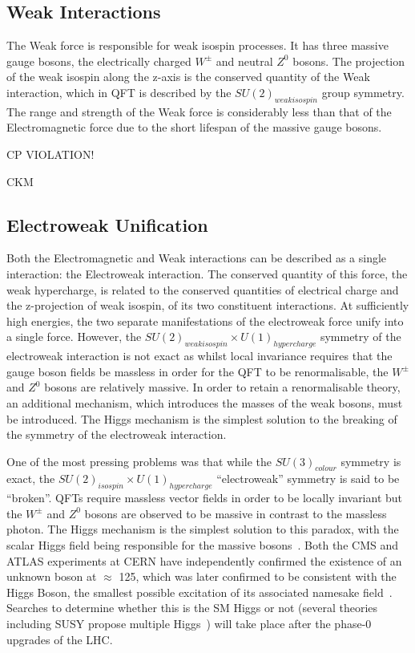 \subsection{Weak Interactions}\label{subsec:weakForce}
The Weak force is responsible for weak isospin processes. 
It has three massive gauge bosons, the electrically charged $W^{\pm}$ and neutral $Z^{0}$ bosons. 
The projection of the weak isospin along the z-axis is the conserved quantity of the Weak interaction, which in QFT is described by the $SU(2)_{weak isospin}$ group symmetry. 
The range and strength of the Weak force is considerably less than that of the Electromagnetic force due to the short lifespan of the massive gauge bosons\cite{ElectroweakStrong}. 


CP VIOLATION!	

CKM

\subsection{Electroweak Unification}\label{subsec:electroweak}

Both the Electromagnetic and Weak interactions can be described as a single interaction: the Electroweak interaction. 
The conserved quantity of this force, the weak hypercharge, is related to the conserved quantities of electrical charge and the z-projection of weak isospin, of its two constituent interactions. 
At sufficiently high energies, the two separate manifestations of the electroweak force unify into a single force. 
However, the $SU(2)_{weak isospin} \times U(1)_{hypercharge}$ symmetry of the electroweak interaction is not exact as whilst local invariance requires that the gauge boson fields be massless in order for the QFT to be renormalisable, the $W^{\pm}$ and $Z^{0}$ bosons are relatively massive. 
In order to retain a renormalisable theory, an additional mechanism, which introduces the masses of the weak bosons, must be introduced. 
The Higgs mechanism is the simplest solution to the breaking of the symmetry of the electroweak interaction\cite{LagrangiansSM}. 

One of the most pressing problems was that while the $SU(3)_{colour}$ symmetry is exact, the $SU(2)_{isospin} \times U(1)_{hypercharge}$ ``electroweak'' symmetry is said to be ``broken''. 
QFTs require massless vector fields in order to be locally invariant but the $W^{\pm}$ and $Z^{0}$ bosons are observed to be massive in contrast to the massless photon. 
The Higgs mechanism is the simplest solution to this paradox, with the scalar Higgs field being responsible for the massive bosons~\cite{oldcms}. 
Both the CMS and ATLAS experiments at CERN have independently confirmed the existence of an unknown boson at $\approx$ 125\GeV, which was later confirmed to be consistent with the Higgs Boson, the smallest possible excitation of its associated namesake field~\cite{HiggsCMS,HiggsATLAS}. 
Searches to determine whether this is the SM Higgs or not (several theories including SUSY propose multiple Higgs~\cite{Khalil:2003vd,Gianotti:2002xx}) will take place after the phase-0 upgrades of the LHC. 

